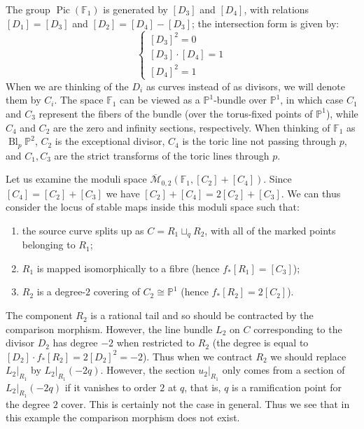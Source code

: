 \documentclass[11pt]{amsart}
\newcommand{\M}[4]{\overline{\mathcal{M}}_{#1,#2}(#3,#4)}
\newcommand{\PP}{\mathbb P}
\newcommand{\Pic}{\operatorname{Pic}}
\theoremstyle{definition}
\theoremstyle{definition}
\begin{document}
The group $\Pic(\mathbb F_1)$ is generated by $[D_3]$ and $[D_4]$, with relations $[D_1]=[D_3]$ and $[D_2]=[D_4]-[D_3]$; the intersection form is given by:
\[
{}
\begin{cases}
 [D_3]^2=0 \\
 [D_3]\cdot [D_4]=1 \\
 [D_4]^2=1
\end{cases} 
\]
When we are thinking of the $D_i$ as curves instead of as divisors, we will denote them by $C_i$. The space $\mathbb F_1$ can be viewed as a $\PP^1$-bundle over $\PP^1$, in which case $C_1$ and $C_3$ represent the fibers of the bundle (over the torus-fixed points of $\PP^1$), while $C_4$ and $C_2$ are the zero and infinity sections, respectively. When thinking of $\mathbb F_1$ as $\operatorname{Bl}_{p}\PP^2$, $C_2$ is the exceptional divisor, $C_4$ is the toric line not passing through $p$, and $C_1,C_3$ are the strict transforms of the toric lines through $p$.

Let us examine the moduli space $\M{0}{2}{\mathbb F_1}{[C_2]+[C_4]}$. Since $[C_4] = [C_2]+[C_3]$ we have $[C_2]+[C_4] = 2[C_2] + [C_3]$. We can thus consider the locus of stable maps inside this moduli space such that:
\begin{enumerate}
\item the source curve splits up as $C=R_1 \sqcup_q R_2$, with all of the marked points belonging to $R_1$;
\item $R_1$ is mapped isomorphically to a fibre (hence $f_*[R_1] = [C_3]$);
\item $R_2$ is a degree-$2$ covering of $C_2 \cong \PP^1$ (hence $f_*[R_2]=2[C_2]$).
\end{enumerate}
The component $R_2$ is a rational tail and so should be contracted by the comparison morphism. However, the line bundle $L_2$ on $C$ corresponding to the divisor $D_2$ has degree $-2$ when restricted to $R_2$ (the degree is equal to $[D_2] \cdot f_*[R_2]=2[D_2]^2 = -2$). Thus when we contract $R_2$ we should replace $L_2|_{R_1}$ by $L_2|_{R_1}(-2q)$. However, the section $u_2|_{R_1}$ only comes from a section of $L_2|_{R_1}(-2q)$ if it vanishes to order $2$ at $q$, that is, $q$ is a ramification point for the degree $2$ cover. This is certainly not the case in general. Thus we see that in this example the comparison morphism does not exist.

\begin{comment}

\textcolor{blue}{Something is going on here: in this case there is a boundary component where the map is of the type that we have just described, and the requirement that $u_{2|R_1}$ vanishes of order $2$ at the node defines precisely the intersection with the main component. Check this. Could we possibly exploit this phenomenon to define a smaller compactification, possibly even smaller than quasimaps?} 

\end{comment}
\end{document}
